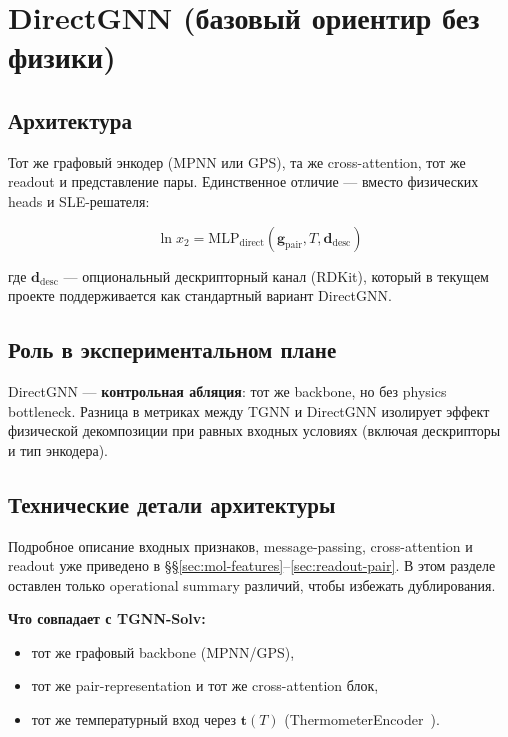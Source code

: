 \documentclass[11pt]{article}
\begin{document}
\section{DirectGNN (базовый ориентир без физики)}

\subsection{Архитектура}

Тот же графовый энкодер (MPNN или GPS), та же cross-attention, тот же readout и представление пары. Единственное отличие --- вместо физических heads и SLE-решателя:

\begin{equation*}
\ln x_2 = \mathrm{MLP}_{\mathrm{direct}}(\mathbf{g}_{\mathrm{pair}}, T, \mathbf{d}_{\mathrm{desc}})
\end{equation*}

где $\mathbf{d}_{\mathrm{desc}}$ --- опциональный дескрипторный канал (RDKit), который в текущем проекте поддерживается как стандартный вариант DirectGNN.

\subsection{Роль в экспериментальном плане}

DirectGNN --- \textbf{контрольная абляция}: тот же backbone, но без physics bottleneck. Разница в метриках между TGNN и DirectGNN изолирует эффект физической декомпозиции при равных входных условиях (включая дескрипторы и тип энкодера).


\subsection{Технические детали архитектуры}

Подробное описание входных признаков, message-passing, cross-attention и readout уже приведено в §§\ref{sec:mol-features}--\ref{sec:readout-pair}. В этом разделе оставлен только operational summary различий, чтобы избежать дублирования.

\textbf{Что совпадает с TGNN-Solv:}
\begin{itemize}
  \item тот же графовый backbone (MPNN/GPS),
  \item тот же pair-representation и тот же cross-attention блок,
  \item тот же температурный вход через $\mathbf{t}(T)$ (ThermometerEncoder~\cite{buckman2018}).
\end{itemize}
\end{document}
